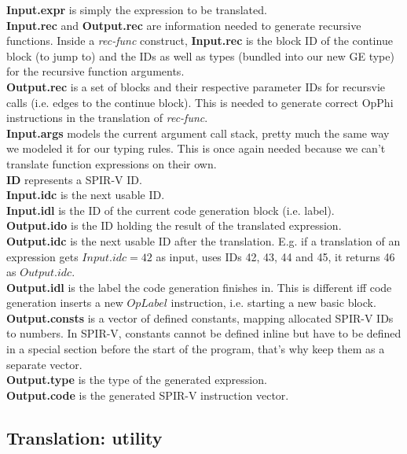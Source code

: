 \documentclass[letterpaper,12pt]{article}
\begin{document}
\noindent \textbf{Input.expr} is simply the expression to be translated. \\
\textbf{Input.rec} and \textbf{Output.rec} are information needed to generate recursive
functions. Inside a \textit{rec-func} construct, \textbf{Input.rec} is the block 
ID of the continue block (to jump to) and the IDs as well as types (bundled into
our new GE type) for the recursive function arguments. \\
\textbf{Output.rec} is a set of blocks and their respective parameter IDs for
recursvie calls (i.e. edges to the continue block). This is needed to
generate correct OpPhi instructions in the translation of \textit{rec-func}. \\
\textbf{Input.args} models the current argument call stack, pretty much the same
way we modeled it for our typing rules. This is once again needed because
we can't translate function expressions on their own. \\
\textbf{ID} represents a SPIR-V ID. \\
\textbf{Input.idc} is the next usable ID. \\
\textbf{Input.idl} is the ID of the current code generation block (i.e. label). \\
\textbf{Output.ido} is the ID holding the result of the translated expression. \\
\textbf{Output.idc} is the next usable ID after the translation.
E.g. if a translation of an expression gets $Input.idc = 42$ as input, 
uses IDs 42, 43, 44 and 45, it returns 46 as $Output.idc$. \\
\textbf{Output.idl} is the label the code generation finishes in.
This is different iff code generation inserts a new $OpLabel$ instruction,
i.e. starting a new basic block. \\
\textbf{Output.consts} is a vector of defined constants, mapping
allocated SPIR-V IDs to numbers. In SPIR-V, constants
cannot be defined inline but have to be defined in a special section before
the start of the program, that's why keep them as a separate vector. \\
\textbf{Output.type} is the type of the generated expression. \\
\textbf{Output.code} is the generated SPIR-V instruction vector.

\subsection{Translation: utility}
\end{document}

